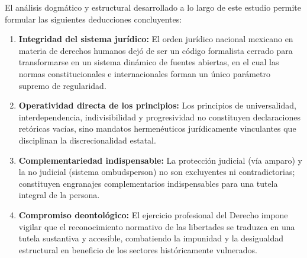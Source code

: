 \documentclass[12pt,spanish,letterpaper,oneside]{article}
\begin{document}
El an\'alisis dogm\'atico y estructural desarrollado a lo largo de este estudio permite formular las siguientes deducciones concluyentes:
\begin{enumerate}
\item \textbf{Integridad del sistema jur\'idico:} El orden jur\'idico nacional mexicano en materia de derechos humanos dej\'o de ser un c\'odigo formalista cerrado para transformarse en un sistema din\'amico de fuentes abiertas, en el cual las normas constitucionales e internacionales forman un \'unico par\'ametro supremo de regularidad.
\item \textbf{Operatividad directa de los principios:} Los principios de universalidad, interdependencia, indivisibilidad y progresividad no constituyen declaraciones ret\'oricas vac\'ias, sino mandatos hermen\'euticos jur\'idicamente vinculantes que disciplinan la discrecionalidad estatal.
\item \textbf{Complementariedad indispensable:} La protecci\'on judicial (v\'ia amparo) y la no judicial (sistema ombudsperson) no son excluyentes ni contradictorias; constituyen engranajes complementarios indispensables para una tutela integral de la persona.
\item \textbf{Compromiso deontol\'ogico:} El ejercicio profesional del Derecho impone vigilar que el reconocimiento normativo de las libertades se traduzca en una tutela sustantiva y accesible, combatiendo la impunidad y la desigualdad estructural en beneficio de los sectores hist\'oricamente vulnerados.
\end{enumerate}
\end{document}
